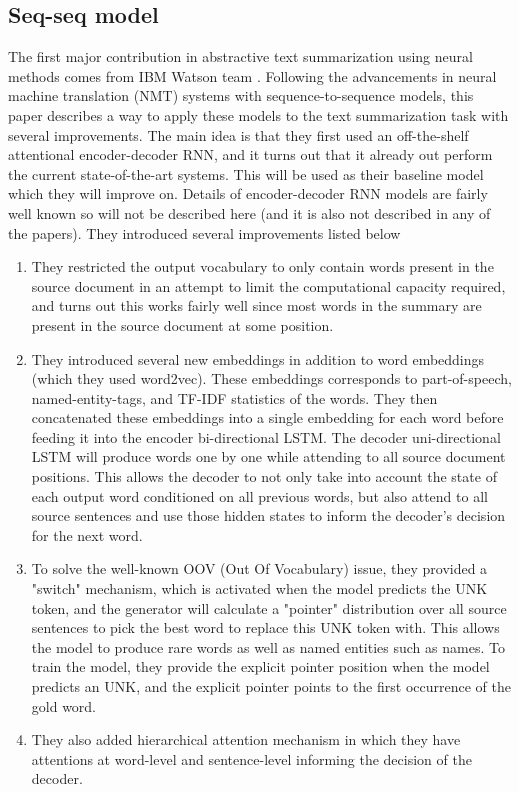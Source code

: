 \documentclass[11pt,a4paper]{article}
\begin{document}
\subsection{Seq-seq model}
The first major contribution in abstractive text summarization using neural methods comes from IBM Watson team \cite{lead}. Following the advancements in neural machine translation (NMT) systems with sequence-to-sequence models, this paper describes a way to apply these models to the text summarization task with several improvements. The main idea is that they first used an off-the-shelf attentional encoder-decoder RNN, and it turns out that it already out perform the current state-of-the-art systems. This will be used as their baseline model which they will improve on. Details of encoder-decoder RNN models are fairly well known so will not be described here (and it is also not described in any of the papers). They introduced several improvements listed below
\begin{enumerate}
	\item They restricted the output vocabulary to only contain words present in the source document in an attempt to limit the computational capacity required, and turns out this works fairly well since most words in the summary are present in the source document at some position.
	\item They introduced several new embeddings in addition to word embeddings (which they used word2vec). These embeddings corresponds to part-of-speech, named-entity-tags, and TF-IDF statistics of the words. They then concatenated these embeddings into a single embedding for each word before feeding it into the encoder bi-directional LSTM. The decoder uni-directional LSTM will produce words one by one while attending to all source document positions. This allows the decoder to not only take into account the state of each output word conditioned on all previous words, but also attend to all source sentences and use those hidden states to inform the decoder's decision for the next word. 
	\item To solve the well-known OOV (Out Of Vocabulary) issue, they provided a "switch" mechanism, which is activated when the model predicts the UNK token, and the generator will calculate a "pointer" distribution over all source sentences to pick the best word to replace this UNK token with. This allows the model to produce rare words as well as named entities such as names. To train the model, they provide the explicit pointer position when the model predicts an UNK, and the explicit pointer points to the first occurrence of the gold word.
	\item They also added hierarchical attention mechanism in which they have attentions at word-level and sentence-level informing the decision of the decoder. 
\end{enumerate}
\end{document}

